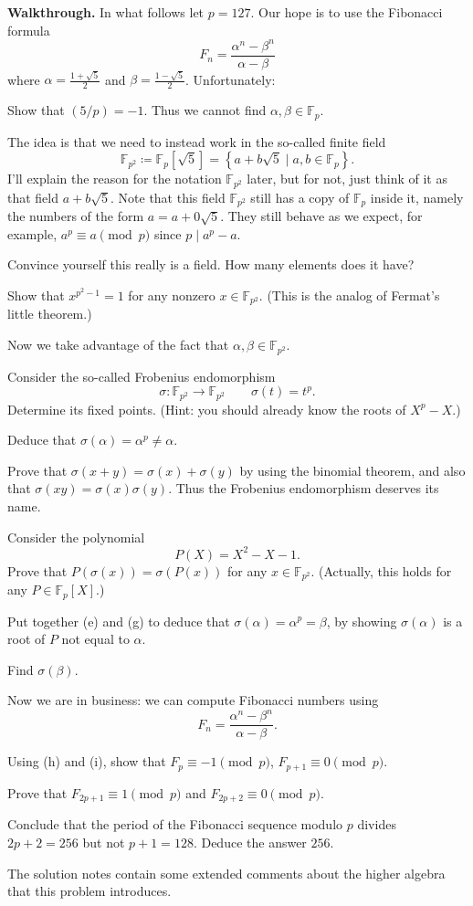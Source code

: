 \documentclass[11pt]{scrartcl}
\providecommand{\FF}{\mathbb F}
\providecommand{\ii}{\item}
\newenvironment{walkthrough}{\noindent\textbf{\color{green!40!black}Walkthrough.}}{}
\begin{document}
\begin{walkthrough}
In what follows let $p = 127$.
Our hope is to use the Fibonacci formula
\[ F_n = \frac{\alpha^n - \beta^n}{\alpha - \beta} \]
where $\alpha = \frac{1 + \sqrt5}{2}$ and $\beta = \frac{1 - \sqrt5}{2}$.
Unfortunately:
\begin{walk}
  \ii Show that $(5/p) = -1$.
  Thus we cannot find $\alpha, \beta \in \FF_p$.
\end{walk}
The idea is that we need to instead work in
the so-called finite field
\[ \FF_{p^2} \coloneq \FF_p[\sqrt5]
  = \left\{ a + b \sqrt 5 \mid a,b \in \FF_p \right\}. \]
I'll explain the reason for the notation $\FF_{p^2}$ later,
but for not, just think of it as that field $a+b\sqrt5$.
Note that this field $\FF_{p^2}$ still has a copy of $\FF_p$
inside it, namely the numbers of the form $a = a+0\sqrt5$.
They still behave as we expect,
for example, $a^p \equiv a \pmod p$
since $p \mid a^p-a$.
\begin{walk}[resume]
  \ii Convince yourself this really is a field.
  How many elements does it have?
  \ii Show that $x^{p^2-1} = 1$
  for any nonzero $x \in \FF_{p^2}$.
  (This is the analog of Fermat's little theorem.)
\end{walk}
Now we take advantage of the fact that $\alpha, \beta \in \FF_{p^2}$.
\begin{walk}[resume]
  \ii Consider the so-called Frobenius endomorphism
  \[ \sigma \colon \FF_{p^2} \to \FF_{p^2}
    \qquad \sigma(t) = t^p. \]
  Determine its fixed points.
  (Hint: you should already know the roots of $X^p - X$.)
  \ii Deduce that $\sigma(\alpha) = \alpha^p \neq \alpha$.
  \ii Prove that $\sigma(x+y) = \sigma(x) + \sigma(y)$
  by using the binomial theorem,
  and also that $\sigma(xy) = \sigma(x) \sigma(y)$.
  Thus the Frobenius endomorphism deserves its name.
  \ii Consider the polynomial
  \[ P(X) = X^2 - X - 1. \]
  Prove that $P(\sigma(x)) = \sigma(P(x))$
  for any $x \in \FF_{p^2}$.
  (Actually, this holds for any $P \in \FF_p[X]$.)
  \ii Put together (e) and (g) to deduce that $\sigma(\alpha) = \alpha^p = \beta$,
  by showing $\sigma(\alpha)$ is a root of $P$ not equal to $\alpha$.
  \ii Find $\sigma(\beta)$.
\end{walk}
Now we are in business:
we can compute Fibonacci numbers using
\[ F_n = \frac{\alpha^n - \beta^n}{\alpha - \beta}. \]
\begin{walk}[resume]
  \ii Using (h) and (i), show that $F_p \equiv -1 \pmod p$,
  $F_{p+1} \equiv 0 \pmod p$.
  \ii Prove that $F_{2p+1} \equiv 1 \pmod p$
  and $F_{2p+2} \equiv 0 \pmod p$.
  \ii Conclude that the period of the Fibonacci sequence modulo $p$
  divides $2p+2= 256$ but not $p+1 = 128$.
  Deduce the answer $256$.
\end{walk}
The solution notes contain some extended comments
about the higher algebra that this problem introduces.
\end{walkthrough}
\end{document}
